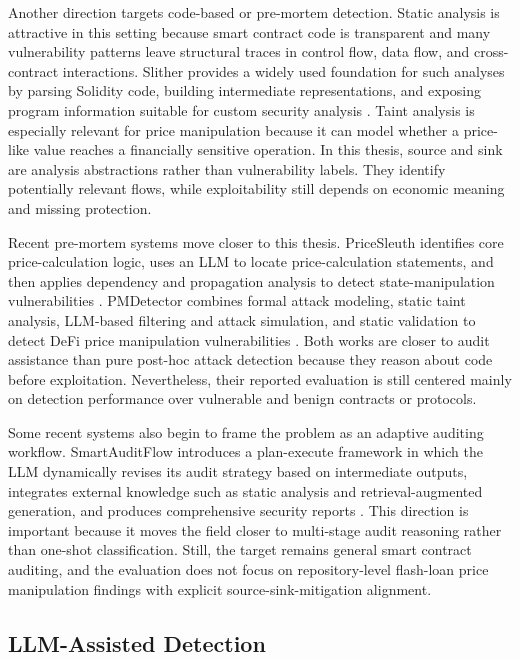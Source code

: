Another direction targets code-based or pre-mortem detection. Static analysis
is attractive in this setting because smart contract code is transparent and
many vulnerability patterns leave structural traces in control flow, data flow,
and cross-contract interactions. Slither provides a widely used foundation for
such analyses by parsing Solidity code, building intermediate
representations, and exposing program information suitable for custom security
analysis \citep{slither}. Taint analysis is especially relevant for price
manipulation because it can model whether a price-like value reaches a
financially sensitive operation. In this thesis, source and sink are analysis
abstractions rather than vulnerability labels. They identify potentially
relevant flows, while exploitability still depends on economic meaning and
missing protection.

Recent pre-mortem systems move closer to this thesis. PriceSleuth identifies
core price-calculation logic, uses an LLM to locate price-calculation
statements, and then applies dependency and propagation analysis to detect
state-manipulation vulnerabilities \citep{pricesleuth}. PMDetector combines
formal attack modeling, static taint analysis, LLM-based filtering and attack
simulation, and static validation to detect DeFi price manipulation
vulnerabilities \citep{pmdetector}. Both works are closer to audit assistance
than pure post-hoc attack detection because they reason about code before
exploitation. Nevertheless, their reported evaluation is still centered mainly
on detection performance over vulnerable and benign contracts or protocols.

Some recent systems also begin to frame the problem as an adaptive auditing
workflow. SmartAuditFlow introduces a plan-execute framework in which the LLM
dynamically revises its audit strategy based on intermediate outputs, integrates
external knowledge such as static analysis and retrieval-augmented generation,
and produces comprehensive security reports \citep{smartauditflow}. This
direction is important because it moves the field closer to multi-stage audit
reasoning rather than one-shot classification. Still, the target remains
general smart contract auditing, and the evaluation does not focus on
repository-level flash-loan price manipulation findings with explicit
source-sink-mitigation alignment.

\subsection{LLM-Assisted Detection}

